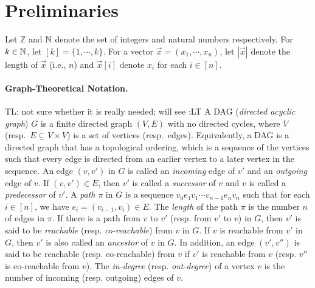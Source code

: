 \documentclass{llncs}
\newcommand{\tl}[1]{\color{blue} {TL: #1 :LT} \color{black}}
\newcommand{\tl}[1]{}
\begin{document}
\section{Preliminaries}

Let $\mathbb{Z}$ and $\mathbb{N}$ denote the set of integers and natural numbers respectively. For $k \in \mathbb{N}$, let $[k] = \{1,\cdots, k\}$. For a vector $\vec{x}=(x_1,\cdots, x_n)$, let $|\vec{x}|$ denote the length of $\vec{x}$ (i.e., $n$) and  $\vec{x}[i]$ denote $x_i$ for each $i \in [n]$.

\paragraph{Graph-Theoretical Notation.} \tl{not sure whether it is really needed; will see}
A DAG (\emph{directed acyclic graph}) $G$ is a finite directed graph $(V, E)$ with
no directed cycles, where $V$ (resp.~$E \subseteq V \times V$) is a set of vertices (resp.~edges).
Equivalently, a DAG is a directed graph that has a topological ordering, which
is a sequence of the vertices such that every edge is directed from an earlier 
vertex to a later vertex in the sequence. An edge $(\mathit{v},\mathit{v'})$ in
$G$ is called an \emph{incoming} edge of $\mathit{v'}$ and an \emph{outgoing}
edge of $\mathit{v}$. If $(\mathit{v},\mathit{v'}) \in E$, then $\mathit{v'}$ is
called a \emph{successor} of $\mathit{v}$ and $\mathit{v}$ is called a
\emph{predecessor} of $\mathit{v'}$. A \emph{path} $\pi$ in $G$ is a sequence
$\mathit{v}_0 \mathit{e}_1 \mathit{v}_1 \cdots \mathit{v}_{n-1} \mathit{e}_n
\mathit{v}_n$ such that for each $i \in [n]$, we have $\mathit{e}_i =
(\mathit{v}_{i-1},\mathit{v}_i) \in E$. The \emph{length} of the path $\pi$
is the number $n$ of edges in $\pi$. If there is a path from
$\mathit{v}$ to $\mathit{v'}$ (resp. from $\mathit{v'}$ to $\mathit{v}$) in $G$,
then $\mathit{v'}$ is said to be \emph{reachable} (resp. \emph{co-reachable})
from $\mathit{v}$ in $G$. If $\mathit{v}$ is reachable from $\mathit{v'}$ in
$G$, then $\mathit{v'}$ is also called an \emph{ancestor} of $\mathit{v}$ in
$G$. In addition, an edge $(\mathit{v'},\mathit{v''})$ is said to be reachable 
(resp. co-reachable) from $\mathit{v}$ if $\mathit{v'}$ is reachable from $\mathit{v}$ (resp. $\mathit{v''}$ is co-reachable from $\mathit{v}$). The \emph{in-degree} (resp. \emph{out-degree}) of a vertex $\mathit{v}$ is the number of incoming (resp. outgoing) edges of $\mathit{v}$. 
\end{document}
